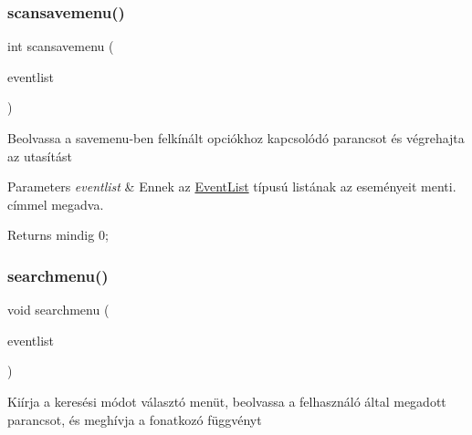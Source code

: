 \subsubsection{\texorpdfstring{scansavemenu()}{scansavemenu()}}
{\footnotesize\ttfamily int scansavemenu (\begin{DoxyParamCaption}\item[{\hyperlink{struct_event_list}{Event\+List} const $\ast$}]{eventlist }\end{DoxyParamCaption})}

Beolvassa a savemenu-\/ben felkínált opciókhoz kapcsolódó parancsot és végrehajta az utasítást 
\begin{DoxyParams}{Parameters}
{\em eventlist} & Ennek az \hyperlink{struct_event_list}{Event\+List} típusú listának az eseményeit menti. címmel megadva. \\
\hline
\end{DoxyParams}
\begin{DoxyReturn}{Returns}
mindig 0; 
\end{DoxyReturn}
\mbox{\label{group__menu_ga38d64ff02f60ebcb1988655ea12540a6}} 
\subsubsection{\texorpdfstring{searchmenu()}{searchmenu()}}
{\footnotesize\ttfamily void searchmenu (\begin{DoxyParamCaption}\item[{\hyperlink{struct_event_list}{Event\+List} $\ast$}]{eventlist }\end{DoxyParamCaption})}

Kiírja a keresési módot választó menüt, beolvassa a felhasználó által megadott parancsot, és meghívja a fonatkozó függvényt 